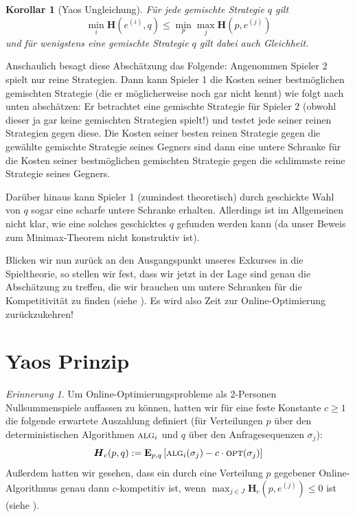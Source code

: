 \documentclass[a4paper,ngerman,12pt,bibtotoc]{scrartcl}
\theoremstyle{definition}
\theoremstyle{plain}
\newtheorem{kor}[defn]{Korollar}
\theoremstyle{remark}
\newtheorem{erin}[defn]{Erinnerung}
\renewcommand{\_}{\mathpunct{.}\,}
\newcommand{\?}{\,{:}\,}
\newcommand{\Alg}{\ensuremath{\textsc{alg}}}
\newcommand{\Opt}{\ensuremath{\textsc{opt}}}
\newcommand{\EE}{\mathbf{E}}
\newcommand{\EH}{\boldsymbol{H}}
\begin{document}
	\begin{kor}[Yaos Ungleichung]\label{kor:YaosUngleichung} 
		Für jede gemischte Strategie $q$ gilt
		\[\min_i\EH(e^{(i)},q) \leq \min_p\max_j\EH(p,e^{(j)})\]
		und für wenigstens eine gemischte Strategie $q$ gilt dabei auch Gleichheit.
	\end{kor}
	
	Anschaulich besagt diese Abschätzung das Folgende: Angenommen Spieler 2 spielt nur reine Strategien. Dann kann Spieler 1 die Kosten seiner bestmöglichen gemischten Strategie (die er möglicherweise noch gar nicht kennt) wie folgt nach unten abschätzen: Er betrachtet eine gemischte Strategie für Spieler 2 (obwohl dieser ja gar keine gemischten Strategien spielt!) und testet jede seiner reinen Strategien gegen diese. Die Kosten seiner besten reinen Strategie gegen die gewählte gemischte Strategie seines Gegners sind dann eine untere Schranke für die Kosten seiner bestmöglichen gemischten Strategie gegen die schlimmste reine Strategie seines Gegners.
	
	Darüber hinaus kann Spieler 1 (zumindest theoretisch) durch geschickte Wahl von $q$ sogar eine scharfe untere Schranke erhalten. Allerdings ist im Allgemeinen nicht klar, wie eine solches geschicktes $q$ gefunden werden kann (da unser Beweis zum Minimax-Theorem nicht konstruktiv ist).

	Blicken wir nun zurück an den Ausgangspunkt unseres Exkurses in die Spieltheorie, so stellen wir fest, dass wir jetzt in der Lage sind genau die Abschätzung zu treffen, die wir brauchen um untere Schranken für die Kompetitivität zu finden (siehe ). Es wird also Zeit zur Online-Optimierung zurückzukehren!
		

	\section{Yaos Prinzip}\label{sec:YaosPrinzip}
	
	\begin{erin}
		Um Online-Optimierungsprobleme als 2-Personen Nullsummenspiele auffassen zu können, hatten wir für eine feste Konstante $c\geq 1$ die folgende erwartete Auszahlung definiert (für Verteilungen $p$ über den deterministischen Algorithmen $\Alg_i$ und $q$ über den Anfragesequenzen $\sigma_j$):
			\[\EH_c(p,q) := \EE_{p,q}\left[\Alg_i(\sigma_j) - c\cdot\Opt(\sigma_j)\right]\]
		Außerdem hatten wir gesehen, dass ein durch eine Verteilung $p$ gegebener Online-Algorithmus genau dann $c$-kompetitiv ist, wenn $\max_{j\in J} \EH_c(p,e^{(j)}) \leq 0$ ist (siehe ).
	\end{erin}
	
\end{document}
